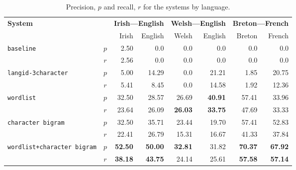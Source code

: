 \documentclass[11pt]{article}
\begin{document}
\begin{table}
\begin{center}
\begin{tabular}{|lc|r|r|r|r|r|r|}
\hline
\multirow{2}{*}{\textbf{System}}            & & \multicolumn{2}{c}{\textbf{Irish---English}} & \multicolumn{2}{|c|}{\textbf{Welsh---English}} & \multicolumn{2}{c|}{\textbf{Breton---French}}  \\\cline{3-8}
                                          &      &  Irish &  English & Welsh  & English & Breton & French \\
\hline 
\multirow{2}{*}{\texttt{baseline}}        &  $p$ &  2.50   & 0.0      & 0.0   & 0.0 & 0.0 & 0.0 \\
                                          & $r$  & 2.56    & 0.0      & 0.0   & 0.0 & 0.0 & 0.0 \\
\hline
\multirow{2}{*}{\texttt{langid-3character}}         &  $p$ &  5.00   & 14.29    & 0.0   & 21.21 & 1.85 & 20.75 \\
                                          & $r$  & 5.41    & 8.45     & 0.0   & 14.58 & 1.92 & 12.36 \\
\hline
\multirow{2}{*}{\texttt{wordlist}}        &  $p$ &  32.50 & 28.57     & 26.69 & {\bf 40.91} & 57.41 & 33.96 \\
                                          & $r$  & 23.64  & 26.09     & {\bf 26.03} & {\bf 33.75} & 47.69 & 33.33 \\
\hline
\multirow{2}{*}{\texttt{character bigram}}          &  $p$ &  32.50   & 35.71   & 23.44 & 19.70  & 57.41 & 52.83 \\
                                          & $r$  & 22.41    & 26.79   & 15.31 & 16.67 & 41.33 & 37.84 \\
\hline
\multirow{2}{*}{\texttt{wordlist+character bigram}} &  $p$ &  {\bf 52.50}   & {\bf 50.00}   & {\bf 32.81} & 31.82 & {\bf 70.37} & {\bf 67.92} \\
                                          & $r$  & {\bf 38.18}    & {\bf 43.75}   & 24.14 & 25.61 & {\bf 57.58} & {\bf 57.14} \\
\hline
\end{tabular}
\end{center}
\vspace{-0.4cm}
\caption{Precision, $p$ and recall, $r$ for the systems by language.}
\label{table:precisionrecall}

\end{table}
\end{document}
